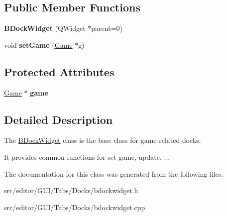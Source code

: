 \subsection*{\-Public \-Member \-Functions}
\begin{DoxyCompactItemize}
\item 
\hypertarget{class_b_dock_widget_ac054be8dfe8c967910190cc31689a2d0}{{\bfseries \-B\-Dock\-Widget} (\-Q\-Widget $\ast$parent=0)}\label{class_b_dock_widget_ac054be8dfe8c967910190cc31689a2d0}

\item 
\hypertarget{class_b_dock_widget_a47e19ff81c8dbe1fbb6f528bec7bdc2f}{void {\bfseries set\-Game} (\hyperlink{class_game}{\-Game} $\ast$g)}\label{class_b_dock_widget_a47e19ff81c8dbe1fbb6f528bec7bdc2f}

\end{DoxyCompactItemize}
\subsection*{\-Protected \-Attributes}
\begin{DoxyCompactItemize}
\item 
\hypertarget{class_b_dock_widget_a2cd159222e09c8034a5ee46628a95fc0}{\hyperlink{class_game}{\-Game} $\ast$ {\bfseries game}}\label{class_b_dock_widget_a2cd159222e09c8034a5ee46628a95fc0}

\end{DoxyCompactItemize}


\subsection{\-Detailed \-Description}
\-The \hyperlink{class_b_dock_widget}{\-B\-Dock\-Widget} class is the base class for game-\/related docks. 

\-It provides common functions for set game, update, ... 

\-The documentation for this class was generated from the following files\-:\begin{DoxyCompactItemize}
\item 
src/editor/\-G\-U\-I/\-Tabs/\-Docks/bdockwidget.\-h\item 
src/editor/\-G\-U\-I/\-Tabs/\-Docks/bdockwidget.\-cpp\end{DoxyCompactItemize}
